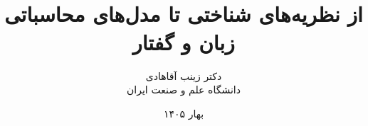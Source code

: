 \documentclass[12pt,a4paper]{book}
\title{{\titlefont\Huge \course}\\[0.5em]
{\Large از نظریه‌های شناختی تا مدل‌های محاسباتی زبان و گفتار}}
\author{دکتر زینب آقاهادی\\[0.4em]
دانشگاه علم و صنعت ایران}
\date{بهار ۱۴۰۵}
\begin{document}
\raggedbottom
\frontmatter
\maketitle

\tableofcontents

\mainmatter









\end{document}

